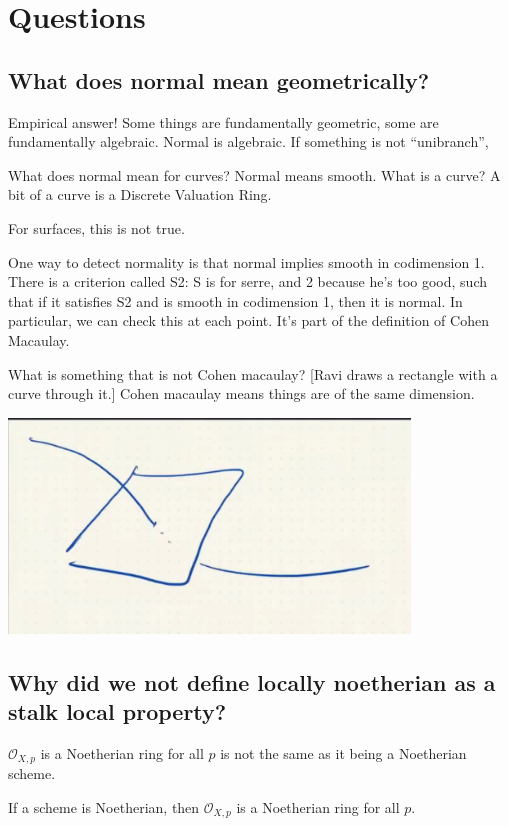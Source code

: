 \documentclass{book}
\renewcommand{\O}{\ensuremath{\mathcal{O}}}
\theoremstyle{definition}
\begin{document}
\section{Questions}

\subsection{What does normal mean geometrically?}

Empirical answer! Some things are fundamentally geometric, some are fundamentally
algebraic. Normal is algebraic. If something is not ``unibranch'', 


What does normal mean for curves? Normal means smooth. What is a curve? A 
bit of a curve is a Discrete Valuation Ring.

For surfaces, this is not true. 

One way to detect normality is that normal implies smooth in codimension 1.
There is a criterion called S2: S is for serre, and 2 because he's too good,
such that if it satisfies S2 and is smooth in codimension 1, then it is normal.
In particular, we can check this at each point. It's part of the definition
of Cohen Macaulay.

What is something that is not Cohen macaulay? [Ravi draws a rectangle with a curve
through it.] Cohen macaulay means things are of the same dimension.

\includegraphics[width=0.8\textwidth]{non-cohen-macaulay.png}

\subsection{Why did we not define locally noetherian as a stalk local property?}

$\O_{X, p}$ is a Noetherian ring for all $p$ is not the same as it being
a Noetherian scheme.

If a scheme is Noetherian, then $\O_{X, p}$ is a Noetherian ring for all $p$.
\end{document}
